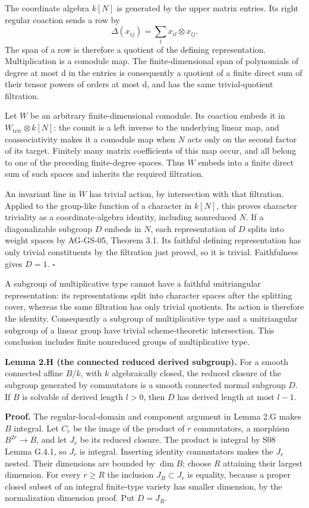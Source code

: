 \documentclass[11pt,a4paper,openany]{report}
\begin{document}
The coordinate algebra \(k[N]\) is generated by the upper matrix entries. Its right regular coaction sends a row by \[
\Delta(x_{ij})=\sum_l x_{il}\otimes x_{lj}.
\] The span of a row is therefore a quotient of the defining representation. Multiplication is a comodule map. The finite-dimensional span of polynomials of degree at most d in the entries is consequently a quotient of a finite direct sum of their tensor powers of orders at most d, and has the same trivial-quotient filtration.

Let \(W\) be an arbitrary finite-dimensional comodule. Its coaction embeds it in \(W_{\mathrm{triv}}\otimes k[N]\): the counit is a left inverse to the underlying linear map, and coassociativity makes it a comodule map when \(N\) acts only on the second factor of its target. Finitely many matrix coefficients of this map occur, and all belong to one of the preceding finite-degree spaces. Thus \(W\) embeds into a finite direct sum of such spaces and inherits the required filtration.

An invariant line in \(W\) has trivial action, by intersection with that filtration. Applied to the group-like function of a character in \(k[N]\), this proves character triviality as a coordinate-algebra identity, including nonreduced \(N\). If a diagonalizable subgroup \(D\) embeds in \(N\), each representation of \(D\) splits into weight spaces by AG-GS-05, Theorem 3.1. Its faithful defining representation has only trivial constituents by the filtration just proved, so it is trivial. Faithfulness gives \(D=1\). \(\square\)

A subgroup of multiplicative type cannot have a faithful unitriangular representation: its representations split into character spaces after the splitting cover, whereas the same filtration has only trivial quotients. Its action is therefore the identity. Consequently a subgroup of multiplicative type and a unitriangular subgroup of a linear group have trivial scheme-theoretic intersection. This conclusion includes finite nonreduced groups of multiplicative type.

\textbf{Lemma 2.H (the connected reduced derived subgroup).} For a smooth connected affine \(B/k\), with \(k\) algebraically closed, the reduced closure of the subgroup generated by commutators is a smooth connected normal subgroup \(D\). If \(B\) is solvable of derived length \(l>0\), then \(D\) has derived length at most \(l-1\).

\textbf{Proof.} The regular-local-domain and component argument in Lemma 2.G makes \(B\) integral. Let \(C_r\) be the image of the product of \(r\) commutators, a morphism \(B^{2r}\to B\), and let \(J_r\) be its reduced closure. The product is integral by S08 Lemma G.4.1, so \(J_r\) is integral. Inserting identity commutators makes the \(J_r\) nested. Their dimensions are bounded by \(\dim B\); choose \(R\) attaining their largest dimension. For every \(r\ge R\) the inclusion \(J_R\subset J_r\) is equality, because a proper closed subset of an integral finite-type variety has smaller dimension, by the normalization dimension proof. Put \(D=J_R\).
\end{document}
